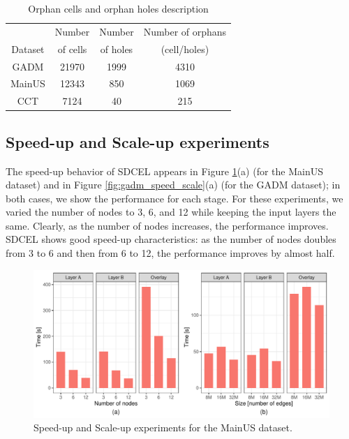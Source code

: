 \begin{table}
    \centering
    \caption{Orphan cells and orphan holes description}
    \label{tab:orphans}
    \begin{tabular}{c c c c}
        \toprule
                & Number   & Number   & Number of orphans   \\
        Dataset & of cells & of holes & (cell/holes) \\
        \midrule
        GADM  & 21970      & 1999     & 4310 \\
        MainUS& 12343      & 850      & 1069 \\
        CCT   & 7124       & 40       & 215  \\
        \bottomrule
    \end{tabular}
\end{table}

\subsection{Speed-up and Scale-up experiments} \label{sec:speed_scale}
The speed-up behavior of SDCEL appears in Figure \ref{fig:mainus_speed_scale}(a) (for the MainUS dataset) and in Figure \ref{fig:gadm_speed_scale}(a) (for the GADM dataset); in both cases, we show the performance for each stage. For these experiments, we varied the number of nodes to 3, 6, and 12 while keeping the input layers the same. Clearly, as the number of nodes increases, the performance improves. SDCEL shows good speed-up characteristics: as the number of nodes doubles from 3 to 6 and then from 6 to 12, the performance improves by almost half.

\begin{figure}
    \centering
    \includegraphics[width=\textwidth]{chapterSDCEL/MainUS_SS/MainUS_SS} 
    \caption{Speed-up and Scale-up experiments for the MainUS dataset.} 
\label{fig:mainus_speed_scale}
\end{figure}

